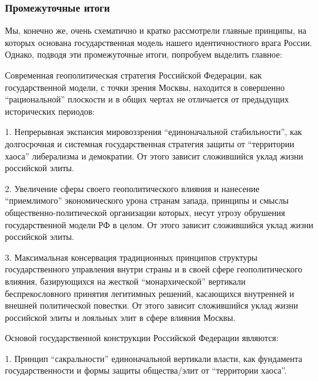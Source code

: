  
 
 
 
 

\subsubsection{Промежуточные итоги}
\label{sec:16_01_2022.stz.news.ua.hvylya.1.anatomia_vraga.11.itogi}

Мы, конечно же, очень схематично и кратко рассмотрели главные принципы, на
которых основана государственная модель нашего идентичностного врага России.
Однако, подводя эти промежуточные итоги, попробуем выделить главное:

Современная геополитическая стратегия Российской Федерации, как государственной
модели, с точки зрения Москвы, находится в совершенно \enquote{рациональной} плоскости
и в общих чертах не отличается от предыдущих исторических периодов:

1. Непрерывная экспансия мировоззрения \enquote{единоначальной стабильности}, как
долгосрочная и системная государственная стратегия защиты от \enquote{территории хаоса}
либерализма и демократии. От этого зависит сложившийся уклад жизни российской
элиты.

2. Увеличение сферы своего геополитического влияния и нанесение \enquote{приемлимого}
экономического урона странам запада, принципы и смыслы общественно-политической
организации которых, несут угрозу обрушения государственной модели РФ в целом.
От этого зависит сложившийся уклад жизни российской элиты.

3. Максимальная консервация традиционных принципов структуры государственного
управления внутри страны и в своей сфере геополитического влияния, базирующихся
на жесткой \enquote{монархической} вертикали беспрекословного принятия легитимных
решений, касающихся внутренней и внешней политической повестки. От этого
зависит сложившийся уклад жизни российской элиты и лояльных элит в сфере
влияния Москвы.

Основой государственной конструкции Российской Федерации являются:

1. Принцип \enquote{сакральности} единоначальной вертикали власти, как фундамента
государственности и формы защиты общества/элит от \enquote{территории хаоса}.

